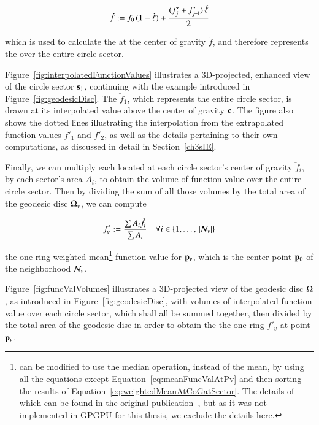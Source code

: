 \begin{equation}
	\check{f} := f_0\,(1 - \check{\ell}) + \frac{(f'_j + f'_{\sjpo})\,\check{\ell}}{2}
	\label{eq:weightedMeanAtCoGatSector}
\end{equation}%

which is used to calculate the \wmfv{} at the center of gravity $\check{f}$, and therefore represents the \wmfv{} over the entire circle sector.

Figure~\ref{fig:interpolatedFunctionValues} illustrates a 3D-projected, enhanced view of the circle sector $\mathbf{s}_1$, continuing with the example introduced in Figure~\ref{fig:geodesicDisc}. The \wmfv{} $\check{f}_1$, which represents the entire circle sector, is drawn at its interpolated value above the center of gravity $\mathbf{c}$. The figure also shows the dotted lines illustrating the interpolation from the extrapolated function values $f'_1$ and $f'_2$, as well as the details pertaining to their own computations, as discussed in detail in Section~\ref{ch3sIE}.

Finally, we can multiply each \wmfv{} located at each circle sector's center of gravity $\check{f}_i$, by each sector's area $A_i$, to obtain the volume of function value over the entire circle sector. Then by dividing the sum of all those volumes by the total area of the geodesic disc $\Omega_v$, we can compute

\begin{equation}
	f'_v := \frac{\sum A_i\check{f}_i}{\sum A_i} \quad \forall i \in \{1,\ldots,\,|\mathcal{N}_v|\}
	\label{eq:meanFuncValAtPv}
\end{equation}%

the one-ring weighted mean\footnote{ can be modified to use the median operation, instead of the mean, by using all the equations except Equation~\ref{eq:meanFuncValAtPv} and then sorting the results of Equation~\ref{eq:weightedMeanAtCoGatSector}. The details of which can be found in the original publication~\cite[s.~3.2]{Mara17}, but as it was not implemented in GPGPU for this thesis, we exclude the details here.} function value for $\mathbf{p}_v$, which is the center point $\mathbf{p}_0$ of the neighborhood $\mathcal{N}_v$.

Figure~\ref{fig:funcValVolumes} illustrates a 3D-projected view of the geodesic disc $\Omega$, as introduced in Figure~\ref{fig:geodesicDisc}, with volumes of interpolated function value over each circle sector, which shall all be summed together, then divided by the total area of the geodesic disc in order to obtain the the one-ring \wmfv{} $f'_v$ at point $\mathbf{p}_v$.

